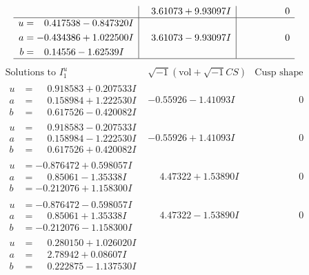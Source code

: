 \documentclass[1p]{elsarticle_modified}
\theoremstyle{definition}
\newcommand{\I}{\sqrt{-1}}
\begin{document}
$$\begin{array}{c|c|c}
 & \phantom{-}3.61073 + 9.93097 I & \phantom{-0.000000 } 0 \\ \hline\begin{aligned}
u &= \phantom{-}0.417538 - 0.847320 I \\
a &= -0.434386 + 1.022500 I \\
b &= \phantom{-}0.14556 - 1.62539 I\end{aligned}
 & \phantom{-}3.61073 - 9.93097 I & \phantom{-0.000000 } 0\\
 \hline 
 \end{array}$$\newpage$$\begin{array}{c|c|c}  
\text{Solutions to }I^u_{1}& \I (\text{vol} + \sqrt{-1}CS) & \text{Cusp shape}\\
 \hline 
\begin{aligned}
u &= \phantom{-}0.918583 + 0.207533 I \\
a &= \phantom{-}0.158984 + 1.222530 I \\
b &= \phantom{-}0.617526 - 0.420082 I\end{aligned}
 & -0.55926 - 1.41093 I & \phantom{-0.000000 } 0 \\ \hline\begin{aligned}
u &= \phantom{-}0.918583 - 0.207533 I \\
a &= \phantom{-}0.158984 - 1.222530 I \\
b &= \phantom{-}0.617526 + 0.420082 I\end{aligned}
 & -0.55926 + 1.41093 I & \phantom{-0.000000 } 0 \\ \hline\begin{aligned}
u &= -0.876472 + 0.598057 I \\
a &= \phantom{-}0.85061 - 1.35338 I \\
b &= -0.212076 + 1.158300 I\end{aligned}
 & \phantom{-}4.47322 + 1.53890 I & \phantom{-0.000000 } 0 \\ \hline\begin{aligned}
u &= -0.876472 - 0.598057 I \\
a &= \phantom{-}0.85061 + 1.35338 I \\
b &= -0.212076 - 1.158300 I\end{aligned}
 & \phantom{-}4.47322 - 1.53890 I & \phantom{-0.000000 } 0 \\ \hline\begin{aligned}
u &= \phantom{-}0.280150 + 1.026020 I \\
a &= \phantom{-}2.78942 + 0.08607 I \\
b &= \phantom{-}0.222875 - 1.137530 I\end{aligned}

\end{array}$$
\end{document}

